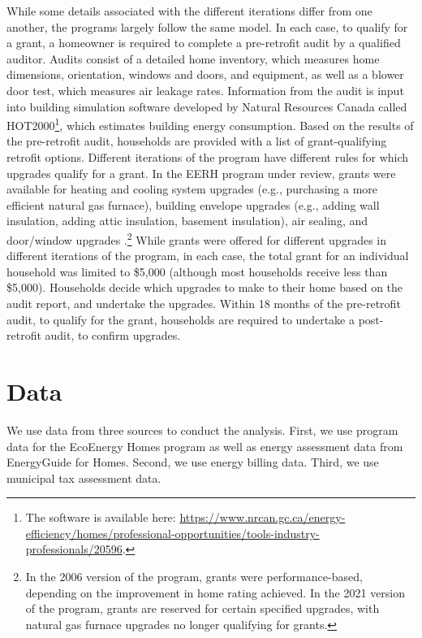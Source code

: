 \documentclass{article}
\begin{document}
While some details associated with the different iterations differ from one another, the programs largely follow the same model. In each case, to qualify for a grant, a homeowner is required to complete a pre-retrofit audit by a qualified auditor. Audits consist of a detailed home inventory, which measures home dimensions, orientation, windows and doors, and equipment, as well as a blower door test, which measures air leakage rates. Information from the audit is input into building simulation software developed by Natural Resources Canada called HOT2000\footnote{The software is available here: \url{https://www.nrcan.gc.ca/energy-efficiency/homes/professional-opportunities/tools-industry-professionals/20596}.}, which estimates building energy consumption. Based on the results of the pre-retrofit audit, households are provided with a list of grant-qualifying retrofit options. Different iterations of the program have different rules for which upgrades qualify for a grant. In the EERH program under review, grants were available for heating and cooling system upgrades (e.g., purchasing a more efficient natural gas furnace), building envelope upgrades (e.g., adding wall insulation, adding attic insulation, basement insulation), air sealing, and door/window upgrades \citep{canada2009granttable}.\footnote{In the 2006 version of the program, grants were performance-based, depending on the improvement in home rating achieved. In the 2021 version of the program, grants are reserved for certain specified upgrades, with natural gas furnace upgrades no longer qualifying for grants.} While grants were offered for different upgrades in different iterations of the program, in each case, the total grant for an individual household was limited to \$5,000 (although most households receive less than \$5,000). Households decide which upgrades to make to their home based on the audit report, and undertake the upgrades. Within 18 months of the pre-retrofit audit, to qualify for the grant, households are required to undertake a post-retrofit audit, to confirm upgrades.


\section{Data}\label{sec:dat}
We use data from three sources to conduct the analysis. First, we use program data for the EcoEnergy Homes program as well as energy assessment data from EnergyGuide for Homes. Second, we use energy billing data. Third, we use municipal tax assessment data.
\end{document}
